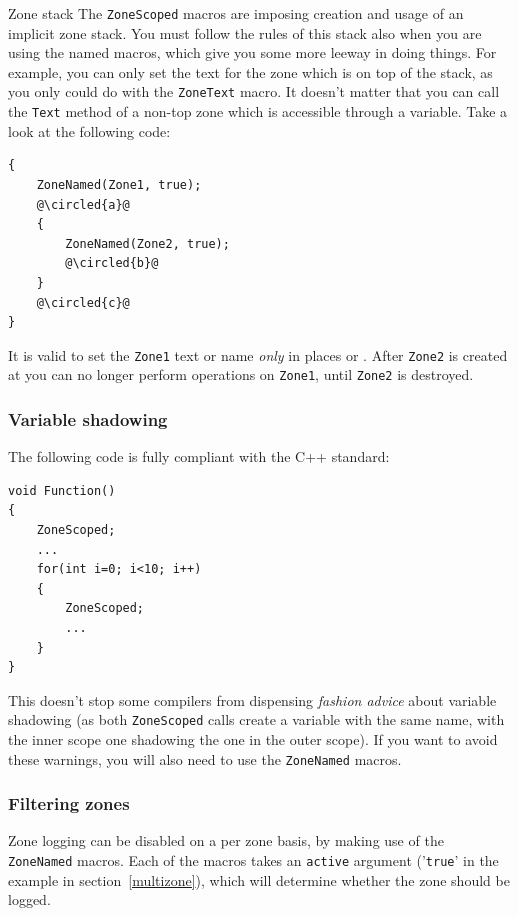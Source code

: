 \documentclass[hidelinks,titlepage,a4paper]{article}
\newcommand*\circled[1]{\tikz[baseline=(char.base)]{
    \node[shape=circle,draw,inner sep=1.5pt] (char) {#1};}}
\begin{document}
\begin{bclogo}[
noborder=true,
couleur=black!5,
logo=\bcattention
]{Zone stack}
The \texttt{ZoneScoped} macros are imposing creation and usage of an implicit zone stack. You must follow the rules of this stack also when you are using the named macros, which give you some more leeway in doing things. For example, you can only set the text for the zone which is on top of the stack, as you only could do with the \texttt{ZoneText} macro. It doesn't matter that you can call the \texttt{Text} method of a non-top zone which is accessible through a variable. Take a look at the following code:

\begin{lstlisting}
{
	ZoneNamed(Zone1, true);
	@\circled{a}@
	{
		ZoneNamed(Zone2, true);
		@\circled{b}@
	}
	@\circled{c}@
}
\end{lstlisting}

It is valid to set the \texttt{Zone1} text or name \emph{only} in places \circled{a} or \circled{c}. After \texttt{Zone2} is created at \circled{b} you can no longer perform operations on \texttt{Zone1}, until \texttt{Zone2} is destroyed.

\end{bclogo}

\subsubsection{Variable shadowing}

The following code is fully compliant with the C++ standard:

\begin{lstlisting}
void Function()
{
	ZoneScoped;
	...
	for(int i=0; i<10; i++)
	{
		ZoneScoped;
		...
	}
}
\end{lstlisting}

This doesn't stop some compilers from dispensing \emph{fashion advice} about variable shadowing (as both \texttt{ZoneScoped} calls create a variable with the same name, with the inner scope one shadowing the one in the outer scope). If you want to avoid these warnings, you will also need to use the \texttt{ZoneNamed} macros.

\subsubsection{Filtering zones}
\label{filteringzones}

Zone logging can be disabled on a per zone basis, by making use of the \texttt{ZoneNamed} macros. Each of the macros takes an \texttt{active} argument ('\texttt{true}' in the example in section~\ref{multizone}), which will determine whether the zone should be logged.
\end{document}
